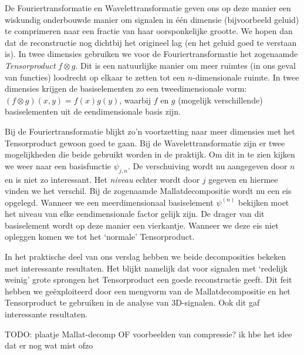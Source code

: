 De Fouriertransformatie en Wavelettransformatie geven ons op deze manier een wiskundig onderbouwde manier om signalen in \'e\'en dimensie (bijvoorbeeld geluid) te comprimeren naar een fractie van haar oorsponkelijke grootte. We hopen dan dat de reconstructie nog dichtbij het origineel lag (en het geluid goed te verstaan is). In twee dimensies gebruiken we voor de Fouriertransformatie het zogenaamde \emph{Tensorproduct} $f \otimes g$. Dit is een natuurlijke manier om meer ruimtes (in ons geval van functies) loodrecht op elkaar te zetten tot een $n$-dimensionale ruimte. In twee dimensies krijgen de basiselementen zo een tweedimensionale vorm: $(f \otimes g)(x,y) = f(x)g(y)$, waarbij $f$ en $g$ (mogelijk verschillende) basiselementen uit de eendimensionale basis zijn.

Bij de Fouriertransformatie blijkt zo'n voortzetting naar meer dimensies met het Tensorproduct gewoon goed te gaan. Bij de Wavelettransformatie zijn er twee mogelijkheden die beide gebruikt worden in de praktijk. Om dit in te zien kijken we weer naar een basisfunctie $\psi_{j,n}$. De verschuiving wordt nu aangegeven door $n$ en is niet zo interessant. Het \emph{niveau} echter wordt door $j$ gegeven en hiermee vinden we het verschil. Bij de zogenaamde Mallatdecompositie wordt nu een eis opgelegd. Wanneer we een meerdimensionaal basiselement $\psi^{(n)}$ bekijken moet het niveau van elke eendimensionale factor gelijk zijn. De drager van dit basiselement wordt op deze manier een vierkantje. Wanneer we deze eis niet opleggen komen we tot het `normale' Tensorproduct.

In het praktische deel van ons verslag hebben we beide decomposities bekeken met interessante resultaten. Het blijkt namelijk dat voor signalen met `redelijk weinig' grote sprongen het Tensorproduct een goede reconstructie geeft. Dit feit hebben we ge\"exploiteerd door een mengvorm van de Mallatdecompositie en het Tensorproduct te gebruiken in de analyse van 3D-signalen. Ook dit gaf interessante resultaten.

TODO: plaatje Mallat-decomp OF voorbeelden van compressie? ik hbe het idee dat er nog wat mist ofzo